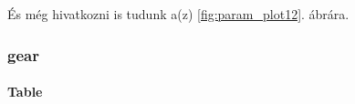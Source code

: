 \documentclass[]{elsarticle} %
\begin{document}
És még hivatkozni is tudunk a(z) \ref{fig:param_plot12}. ábrára.

\hypertarget{gear}{%
\subsubsection{gear}\label{gear}}

\hypertarget{table-1}{%
\paragraph{Table}\label{table-1}}

 
  \providecommand{\huxb}[2]{\arrayrulecolor[RGB]{#1}\global\arrayrulewidth=#2pt}
  \providecommand{\huxvb}[2]{\color[RGB]{#1}\vrule width #2pt}
  \providecommand{\huxtpad}[1]{\rule{0pt}{#1}}
  \providecommand{\huxbpad}[1]{\rule[-#1]{0pt}{#1}}
\end{document}
